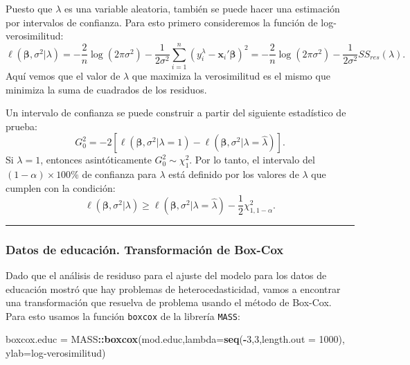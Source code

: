 \documentclass[
]{article}
\newenvironment{Shaded}{\begin{snugshade}}{\end{snugshade}}
\newcommand{\AttributeTok}[1]{\textcolor[rgb]{0.13,0.29,0.53}{#1}}
\newcommand{\DecValTok}[1]{\textcolor[rgb]{0.00,0.00,0.81}{#1}}
\newcommand{\FunctionTok}[1]{\textcolor[rgb]{0.13,0.29,0.53}{\textbf{#1}}}
\newcommand{\NormalTok}[1]{#1}
\newcommand{\OtherTok}[1]{\textcolor[rgb]{0.56,0.35,0.01}{#1}}
\newcommand{\SpecialCharTok}[1]{\textcolor[rgb]{0.81,0.36,0.00}{\textbf{#1}}}
\newcommand{\StringTok}[1]{\textcolor[rgb]{0.31,0.60,0.02}{#1}}
\begin{document}
Puesto que \(\lambda\) es una variable aleatoria, también se puede hacer una estimación por intervalos de confianza. Para esto primero consideremos la función de log-verosimilitud:
\[
\ell(\boldsymbol \beta,\sigma^{2} | \lambda) = -\frac{2}{n}\log \left( 2\pi\sigma^{2}\right) - \frac{1}{2\sigma^{2}}\sum_{i=1}^{n}\left( y_{i}^{\lambda} - \boldsymbol x_{i}'\boldsymbol \beta\right)^{2} = -\frac{2}{n}\log \left( 2\pi\sigma^{2}\right) - \frac{1}{2\sigma^{2}}SS_{res}(\lambda).
\]
Aquí vemos que el valor de \(\lambda\) que maximiza la verosimilitud es el mismo que minimiza la suma de cuadrados de los residuos.

Un intervalo de confianza se puede construir a partir del siguiente estadístico de prueba:
\[
G_{0}^{2} = -2\left[ \ell(\boldsymbol \beta,\sigma^{2} | \lambda=1) - \ell(\boldsymbol \beta,\sigma^{2} | \lambda=\widehat{\lambda}) \right].
\]
Si \(\lambda=1\), entonces asintóticamente \(G_{0}^{2} \sim \chi^{2}_{1}\). Por lo tanto, el intervalo del \((1-\alpha)\times 100\)\% de confianza para \(\lambda\) está definido por los valores de \(\lambda\) que cumplen con la condición:
\[
 \ell(\boldsymbol \beta,\sigma^{2} | \lambda) \geq  \ell(\boldsymbol \beta,\sigma^{2} | \lambda=\widehat{\lambda}) - \frac{1}{2}\chi^{2}_{1,1-\alpha}.
\]

\rule{\textwidth}{0.4pt}

\hypertarget{datos-de-educaciuxf3n.-transformaciuxf3n-de-box-cox}{%
\subsubsection{Datos de educación. Transformación de Box-Cox}\label{datos-de-educaciuxf3n.-transformaciuxf3n-de-box-cox}}

Dado que el análisis de residuso para el ajuste del modelo para los datos de educación mostró que hay problemas de heterocedasticidad, vamos a encontrar una transformación que resuelva de problema usando el método de Box-Cox. Para esto usamos la función \texttt{boxcox} de la librería \texttt{MASS}:

\begin{Shaded}
\begin{Highlighting}[]
\NormalTok{boxcox.educ }\OtherTok{=}\NormalTok{ MASS}\SpecialCharTok{::}\FunctionTok{boxcox}\NormalTok{(mod.educ,}\AttributeTok{lambda=}\FunctionTok{seq}\NormalTok{(}\SpecialCharTok{{-}}\DecValTok{3}\NormalTok{,}\DecValTok{3}\NormalTok{,}\AttributeTok{length.out =} \DecValTok{1000}\NormalTok{),}
                               \AttributeTok{ylab=}\StringTok{\textquotesingle{}log{-}verosimilitud\textquotesingle{}}\NormalTok{)}
\end{Highlighting}
\end{Shaded}
\end{document}
